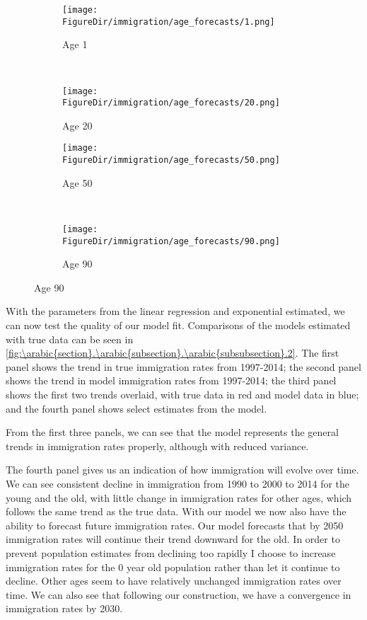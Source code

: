 \documentclass[10pt]{article}
\renewcommand{\thesection}{\arabic{section}}
\renewcommand{\thesubsection}{\thesection.\arabic{subsection}}
\renewcommand{\thesubsubsection}{\thesubsection.\arabic{subsubsection}}
\numberwithin{equation}{subsection}
\newcommand*{\FigureDir}{../../graphs}
\begin{document}
\begin{figure}[!ht]
   \centering
   \caption{\label{fig:\thesubsubsection.1}Immigration Estimated by Linear Regression and Forecasted by Exponential}
   \begin{subfigure}{0.5\textwidth}
      \centering
      \texttt{[image: \\FigureDir/immigration/age\_forecasts/1.png]}
      \caption{Age 1}
   \end{subfigure}%
   ~ %
   \begin{subfigure}{0.5\textwidth}
      \centering
      \texttt{[image: \\FigureDir/immigration/age\_forecasts/20.png]}
      \caption{Age 20}
   \end{subfigure}%
   \newline
   \begin{subfigure}{0.5\textwidth}
      \centering
      \texttt{[image: \\FigureDir/immigration/age\_forecasts/50.png]}
      \caption{Age 50}
   \end{subfigure}%
   ~ %
   \begin{subfigure}{0.5\textwidth}
      \centering
      \texttt{[image: \\FigureDir/immigration/age\_forecasts/90.png]}
      \caption{Age 90}
   \end{subfigure}%
\end{figure}

\par With the parameters from the linear regression and exponential estimated, we can now test the quality of our model fit. Comparisons of the models estimated with true data can be seen in \autoref{fig:\thesubsubsection.2}. The first panel shows the trend in true immigration rates from 1997-2014; the second panel shows the trend in model immigration rates from 1997-2014; the third panel shows the first two trends overlaid, with true data in red and model data in blue; and the fourth panel shows select estimates from the model.

\par From the first three panels, we can see that the model represents the general trends in immigration rates properly, although with reduced variance. 

\par The fourth panel gives us an indication of how immigration will evolve over time. We can see consistent decline in immigration from 1990 to 2000 to 2014 for the young and the old, with little change in immigration rates for other ages, which follows the same trend as the true data. With our model we now also have the ability to forecast future immigration rates. Our model forecasts that by 2050 immigration rates will continue their trend downward for the old. In order to prevent population estimates from declining too rapidly I choose to increase immigration rates for the 0 year old population rather than let it continue to decline. Other ages seem to have relatively unchanged immigration rates over time. We can also see that following our construction, we have a convergence in immigration rates by 2030.
\end{document}
